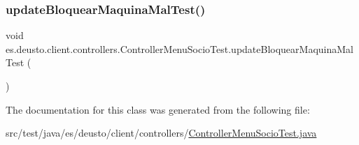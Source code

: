 \subsubsection{\texorpdfstring{updateBloquearMaquinaMalTest()}{updateBloquearMaquinaMalTest()}}
{\footnotesize\ttfamily void es.\+deusto.\+client.\+controllers.\+Controller\+Menu\+Socio\+Test.\+update\+Bloquear\+Maquina\+Mal\+Test (\begin{DoxyParamCaption}{ }\end{DoxyParamCaption})}



The documentation for this class was generated from the following file\+:\begin{DoxyCompactItemize}
\item 
src/test/java/es/deusto/client/controllers/\mbox{\hyperlink{_controller_menu_socio_test_8java}{Controller\+Menu\+Socio\+Test.\+java}}\end{DoxyCompactItemize}
